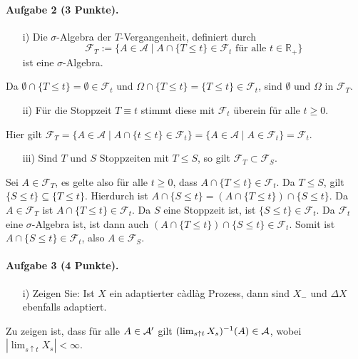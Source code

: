 \documentclass{article}
\begin{document}
\paragraph{Aufgabe 2 \textnormal{(3 Punkte)}.}
\begin{itemize}
\item [i)] Die $\sigma$-Algebra der $T$-Vergangenheit, definiert durch
  \[
    \mathscr{F}_T:=\bigl\{A\in\mathscr{A}\mid A\cap\{T\leq t\}\in\mathscr{F}_t\text{ für alle }t\in\mathbb{R}_+\bigr\}
  \]
  ist eine $\sigma$-Algebra.
\end{itemize}
Da $\emptyset\cap\{T\leq t\}=\emptyset\in\mathscr{F}_t$ und $\Omega\cap\{T\leq t\}=\{T\leq t\}\in\mathscr{F}_t$, sind $\emptyset$ und $\Omega$ in $\mathscr{F}_T$.
\begin{itemize}
\item [ii)] 
  Für die Stoppzeit $T\equiv t$ stimmt diese mit $\mathscr{F}_t$ überein für alle $t\geq 0$.
\end{itemize}
Hier gilt $\mathscr{F}_T=\bigl\{A\in\mathscr{A}\mid A\cap\{t\leq t\}\in\mathscr{F}_t\bigr\}=\{A\in\mathscr{A}\mid A\in\mathscr{F}_t\}=\mathscr{F}_t$.
\begin{itemize}
\item [iii)] Sind $T$ und $S$ Stoppzeiten mit $T\leq S$, so gilt $\mathscr{F}_T\subset\mathscr{F}_S$.
\end{itemize}

Sei $A\in\mathscr{F}_T$, es gelte also für alle $t\geq0$, dass $A\cap\{T\leq t\}\in\mathscr{F}_t$.
Da $T\leq S$, gilt $\{S\leq t\}\subseteq\{T\leq t\}$.
Hierdurch ist $A\cap\{S\leq t\}=(A\cap\{T\leq t\})\cap\{S\leq t\}$.
Da $A\in \mathscr{F}_T$ ist $A\cap\{T\leq t\}\in\mathscr{F}_t$.
Da $S$ eine Stoppzeit ist, ist $\{S\leq t\}\in\mathscr{F}_t$.
Da $\mathscr{F}_t$ eine $\sigma$-Algebra ist, ist dann auch $(A\cap\{T\leq t\})\cap\{S\leq t\}\in\mathscr{F}_t$.
Somit ist $A\cap\{S\leq t\}\in\mathscr{F}_t$, also $A\in\mathscr{F}_S$.

\paragraph{Aufgabe 3 \textnormal{(4 Punkte)}.}
\begin{itemize}
\item [i)] Zeigen Sie: Ist $X$ ein adaptierter càdlàg Prozess, dann sind $X_-$ und $\Delta X$ ebenfalls adaptiert.
\end{itemize}
Zu zeigen ist, dass für alle $A\in{\cal A}'$ gilt $(\lim_{s\uparrow t}X_s)^{-1}(A)\in{\cal A}$, wobei $|\lim_{s\uparrow t}X_s|<\infty$.

\end{document}
